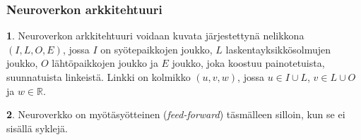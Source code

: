 \documentclass{beamer} %
\newcommand{\lang}[2]{\ifthenelse{\boolean{FIN}}{#1}{#2}}
\theoremstyle{definition}
\newtheorem{defn}{\lang{Määritelmä}{Definition}}
\begin{document}
\begin{frame}\frametitle{Neuroverkon arkkitehtuuri}
\begin{defn}
Neuroverkon arkkitehtuuri voidaan kuvata järjestettynä nelikkona \((I, L, O, E)\), jossa \(I\) on syötepaikkojen joukko, \(L\) laskentayksikkösolmujen joukko, \(O\) lähtöpaikkojen joukko ja \(E\) joukko, joka koostuu painotetuista, suunnatuista linkeistä. Linkki on kolmikko \((u, v, w)\), jossa \(u\in I\cup L\), \(v\in L\cup O\) ja \(w\in \mathbb{R}\).
\end{defn}

\begin{defn}
Neuroverkko on myötäsyötteinen (\textit{feed-forward}) täsmälleen silloin, kun se ei sisällä syklejä.
\end{defn}
\end{frame}
\end{document}
